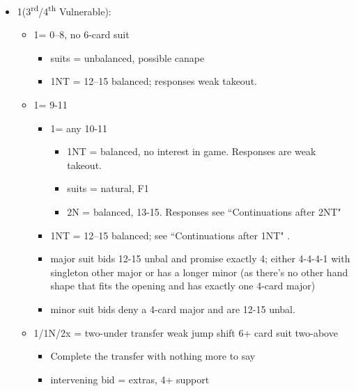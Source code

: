\documentclass[a4paper,14pt]{extarticle}
\begin{document}
\begin{itemize}
\item 1\clubs (3\textsuperscript{rd}/4\textsuperscript{th} Vulnerable):
	\begin{itemize}
   \item 1\diamonds = 0--8, no 6-card suit
		\begin{itemize}
      \item suits = unbalanced, possible canape
      \item 1NT = 12--15 balanced; responses weak takeout.
		\end{itemize}
   \item 1\hearts = 9-11
		\begin{itemize}
      \item 1\spades = any 10-11
			\begin{itemize}
			\item 1NT = balanced, no interest in game. Responses are weak takeout.
			\item suits = natural, F1
			\item 2N = balanced, 13-15. Responses see ``Continuations after 2NT" 
			\end{itemize}
      \item 1NT = 12--15 balanced; see ``Continuations after 1NT" .
      \item major suit bids 12-15 unbal and promise exactly 4; either 4-4-4-1
            with singleton other major or has a longer minor (as there's no other
            hand shape that fits the opening and has exactly one 4-card major)
      \item minor suit bids deny a 4-card major and are 12-15 unbal.
		\end{itemize}
   \item 1\spades/1N/2x = two-under transfer weak jump shift 6+ card suit two-above
		\begin{itemize}
		\item Complete the transfer with nothing more to say
		\item intervening bid = extras, 4+ support
		\end{itemize}
	\end{itemize}

\newpage


\end{itemize}
\end{document}
